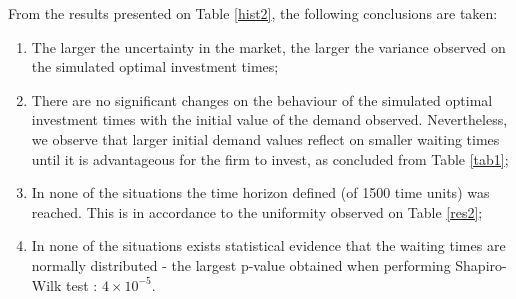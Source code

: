 From the results presented on Table \ref{hist2}, the following conclusions are taken:
\begin{enumerate}
	\item The larger the uncertainty in the market, the larger the variance observed on the simulated optimal investment times;
	
	\item There are no significant changes on the behaviour of the simulated optimal investment times with the initial value of the demand observed. Nevertheless, we observe that larger initial demand values reflect on smaller waiting times until it is advantageous for the firm to invest, as concluded from Table \ref{tab1};
	
	\item In none of the situations the time horizon defined (of 1500 time units) was reached. This is in accordance to the uniformity observed on Table \ref{res2};
	
	\item In none of the situations exists statistical evidence that the waiting times are normally distributed - the largest p-value obtained when performing Shapiro-Wilk test \cite{sw}: $4\times 10^{-5}$.
\end{enumerate}















